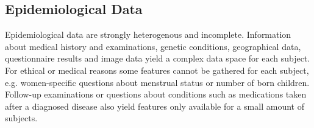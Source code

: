 \documentclass[journal]{style/vgtc} 			          %
\newcommand{\rem}[1]{\textcolor{red}{\sout{#1}}}
\newcommand{\com}[1]{\textcolor{orange}{\uline{#1}}}
\begin{document}
\subsection{Epidemiological Data} \label{EpidemiologicalData}
%

Epidemiological data are strongly heterogenous and incomplete.
%
Information about medical history and examinations, genetic conditions, geographical data, questionnaire results and image data yield a complex data space for each subject.
%
For ethical or medical reasons some features cannot be gathered for each subject, e.g. women-specific questions about menstrual status or number of born children.
%
Follow-up examinations or questions about conditions such as medications taken after a diagnosed disease also yield features only available for a small amount of subjects.
%
\end{document}

